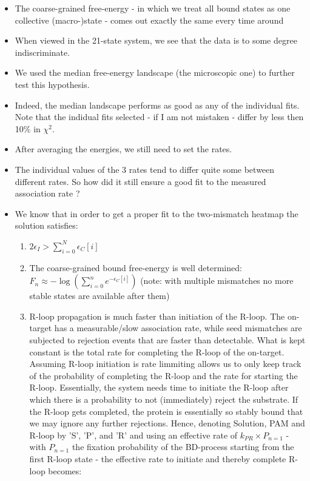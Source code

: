 \documentclass[a4paper,twoside]{revtex4-1}
\begin{document}
\begin{itemize}
\item The coarse-grained free-energy - in which we treat all bound states as one collective (macro-)state - comes out exactly the same every time around
\item When viewed in the 21-state system, we see that the data is to some degree indiscriminate. 
\item We used the median free-energy landscape (the microscopic one) to further test this hypothesis. 
\item Indeed, the median landscape performs as good as any of the individual fits. Note that the indidual fits selected - if I am not mistaken - differ by less then 10$\%$ in $\chi^2$. 


\item After averaging the energies, we still need to set the rates. 
\item The individual values of the 3 rates tend to differ quite some between different rates. So how did it still ensure a good fit to the measured association rate ?
\item 
We know that in order to get a proper fit to the two-mismatch heatmap the solution satisfies: 
	\begin{enumerate}
	\item $2\epsilon_I > \sum_{i=0}^{N} \epsilon_C[i]$
	\item The coarse-grained bound free-energy is well determined: $F_n \approx -\log(\sum_{i=0}^{n} e^{-\epsilon_C[i]})$ (note: with multiple mismatches no more stable states are available after them)
	\item R-loop propagation is much faster than initiation of the R-loop. The on-target has a measurable/slow association rate, while seed mismatches are subjected to rejection events that are faster than detectable. What is kept constant is the total rate for completing the R-loop of the on-target. Assuming R-loop initiation is rate limmiting allows us to only keep track of the probability of completing the R-loop and the rate for starting the R-loop. Essentially, the system needs time to initiate the R-loop after which there is a probability to not (immediately) reject the substrate. If the R-loop gets completed, the protein is essentially so stably bound that we may ignore any further rejections. Hence, denoting Solution, PAM and R-loop by 'S', 'P', and 'R' and using an effective rate of $k_{PR} \times P_{n=1}$ - with $P_{n=1}$ the fixation probability of the BD-process starting from the first R-loop state - the effective rate to initiate and thereby complete R-loop becomes: 

\end{enumerate}
\end{itemize}
\end{document}
